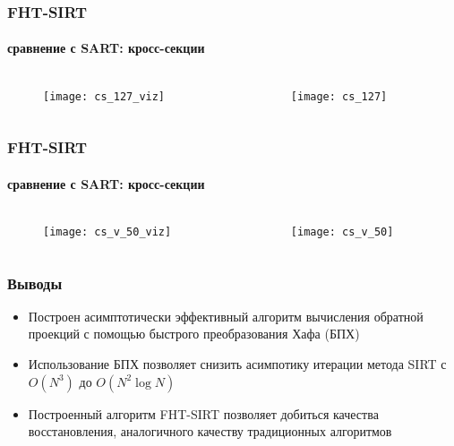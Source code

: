 \begin{frame}
\frametitle{FHT-SIRT}
\framesubtitle{сравнение с SART: кросс-секции}
\begin{columns}[T,onlytextwidth]
  \hspace*{-1cm}
  \begin{column}{0.4\textwidth}
    \begin{figure}
      \centering
      \texttt{[image: cs\_127\_viz]}
    \end{figure}
  \end{column}
  \begin{column}{0.6\textwidth}
    \begin{figure}
      \centering
      \texttt{[image: cs\_127]}
    \end{figure}
  \end{column}
\end{columns}
\end{frame}


\begin{frame}
\frametitle{FHT-SIRT}
\framesubtitle{сравнение с SART: кросс-секции}
\begin{columns}[T,onlytextwidth]
  \hspace*{-1cm}
  \begin{column}{0.4\textwidth}
    \begin{figure}
      \centering
      \texttt{[image: cs\_v\_50\_viz]}
    \end{figure}
  \end{column}
  \begin{column}{0.6\textwidth}
    \begin{figure}
      \centering
      \texttt{[image: cs\_v\_50]}
    \end{figure}
  \end{column}
\end{columns}
\end{frame}


\begin{frame}
\frametitle{Выводы}
\begin{itemize}
  \item Построен асимптотически эффективный алгоритм вычисления обратной проекций с помощью быстрого преобразования Хафа (БПХ)
  \item Использование БПХ позволяет снизить асимпотику итерации метода SIRT с $O(N^3)$ до $O(N^2 \log N)$
  \item Построенный алгоритм FHT-SIRT позволяет добиться качества восстановления, аналогичного качеству традиционных алгоритмов
\end{itemize}
\end{frame}